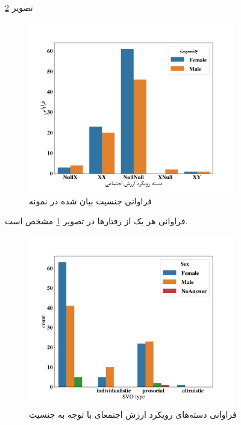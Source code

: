 تصویر \ref{fig:sexualityAndSVOAgainstPopulation}


\begin{figure}[htpb]
    \centering
    \includegraphics[width=0.8\textwidth]{./img/Frequency_Behavior_Phnone_Number.pdf}
    \caption{فراوانی جنسیت بیان شده در نمونه}
    \label{fig:Frequency_Behavior_Phnone_Number}
\end{figure}

فراوانی هر یک از رفتارها در
تصویر \ref{fig:Frequency_Behavior_Phnone_Number}
مشخص است.

\begin{figure}[htpb]
    \centering
    \includegraphics[width=0.8\textwidth]{./img/sexualityAndSVOAgainstPopulation.pdf}
    \caption{فراوانی دسته‌های رویکرد ارزش اجتمعای با توجه به جنسیت}
    \label{fig:sexualityAndSVOAgainstPopulation}
\end{figure}


